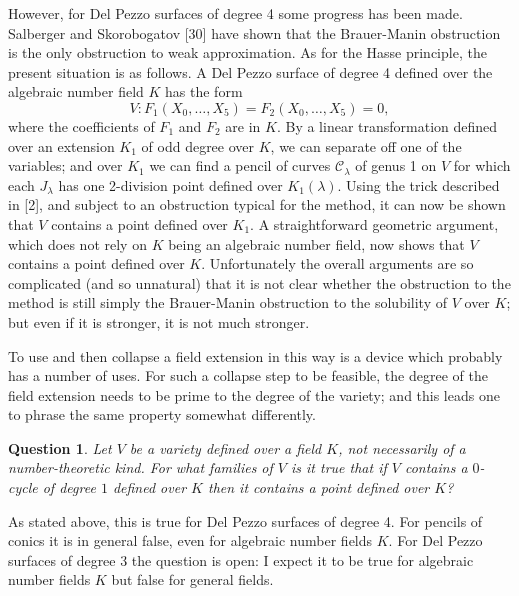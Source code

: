 \documentclass[12pt]{article}
\def\gl{{\lambda}}
\def\sC{{\mathcal C}}
\def\bpr{\begin{question} \label}
\def\epr{\end{question}}
\newtheorem{question}{Question}
\begin{document}
However, for Del Pezzo surfaces of degree 4 some progress has been made.
Salberger
and Skorobogatov [30] have shown that the Brauer-Manin obstruction is the only
obstruction to weak approximation. As for the Hasse principle, the present
situation is as follows. A Del Pezzo surface of degree 4 defined over
the algebraic number field $K$ has the form
\[ V:F_1(X_0,\ldots,X_5)=F_2(X_0,\ldots,X_5)=0, \]
where the coefficients of $F_1$ and $F_2$ are in $K$.
By a linear transformation defined over an extension $K_1$ of odd degree over
$K$, we can separate off one of the variables; and over $K_1$ we can find a
pencil of curves $\sC_\gl$ of genus 1 on $V$ for which each $J_\gl$ has one
2-division point defined over $K_1(\gl)$. 
Using the trick described in [2], and subject to an obstruction typical for
the method, it can now be shown that $V$ contains a point defined over
$K_1$. A straightforward geometric argument, which does not rely on $K$ being
an algebraic number field, now shows that $V$ contains a point
defined over $K$. Unfortunately the overall arguments are so complicated
(and so unnatural) that it is not clear whether the obstruction to the method
is still simply the Brauer-Manin obstruction to the solubility of $V$ over $K$;
but even if it is stronger, it is not much stronger.

To use and then collapse a field extension in this way is a device which
probably has a number of uses. For such a collapse step to be feasible, the
degree of the field extension needs to be prime to the degree of the variety;
and this leads one to phrase the same property somewhat differently.
\bpr{Q13} Let $V$ be a variety defined over a field $K$, not necessarily of
a number-theoretic kind. For what families of $V$ is it true that if $V$
contains
a $0$-cycle of degree $1$ defined over $K$ then it contains a point defined
over $K$?
\epr
As stated above, this is true for Del Pezzo surfaces of degree 4.
For pencils of conics it is in general false, even for algebraic number fields
$K$. For Del Pezzo surfaces of degree 3 the question is open: I expect it to
be true for algebraic number fields $K$ but false for general fields.
\end{document}
